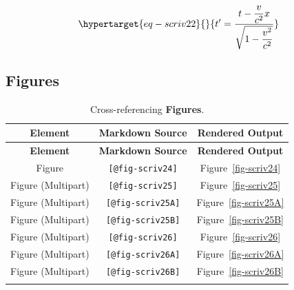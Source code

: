 \documentclass[
  12pt,
  a4paper,
  oneside,
  titlepage,
  toclink=all,
  toc=bibliography]{scrbook}
\theoremstyle{definition}
\theoremstyle{plain}
\theoremstyle{plain}
\theoremstyle{plain}
\theoremstyle{plain}
\theoremstyle{definition}
\theoremstyle{definition}
\theoremstyle{plain}
\theoremstyle{remark}
\begin{document}
\begin{equation}\protect\hypertarget{eq-scriv22}{}{t' = \frac{t - \dfrac{v}{c^{2}}x}{\sqrt{1 - \dfrac{v^{2}}{c^{2}}}}
}\label{eq-scriv22}\end{equation}

\hypertarget{sec-scriv23}{%
\subsection{Figures}\label{sec-scriv23}}

\protect\hypertarget{scriv23}{}{}

\hypertarget{tbl-scriv23}{}
\begin{longtable}[]{@{}ccc@{}}
\toprule\noalign{}
\textbf{Element} & \textbf{Markdown Source} & \textbf{Rendered
Output} \\
\midrule\noalign{}
\endfirsthead
\toprule\noalign{}
\textbf{Element} & \textbf{Markdown Source} & \textbf{Rendered
Output} \\
\midrule\noalign{}
\endhead
\bottomrule\noalign{}
\endlastfoot
Figure & \texttt{{[}@fig-scriv24{]}} &
\protect\hypertarget{cite_58}{}{\label{cite_58}Figure~\ref{fig-scriv24}} \\
Figure (Multipart) & \texttt{{[}@fig-scriv25{]}} &
\protect\hypertarget{cite_59}{}{\label{cite_59}Figure~\ref{fig-scriv25}} \\
Figure (Multipart) & \texttt{{[}@fig-scriv25A{]}} &
\protect\hypertarget{cite_60}{}{\label{cite_60}Figure~\ref{fig-scriv25A}} \\
Figure (Multipart) & \texttt{{[}@fig-scriv25B{]}} &
\protect\hypertarget{cite_61}{}{\label{cite_61}Figure~\ref{fig-scriv25B}} \\
Figure (Multipart) & \texttt{{[}@fig-scriv26{]}} &
\protect\hypertarget{cite_62}{}{\label{cite_62}Figure~\ref{fig-scriv26}} \\
Figure (Multipart) & \texttt{{[}@fig-scriv26A{]}} &
\protect\hypertarget{cite_63}{}{\label{cite_63}Figure~\ref{fig-scriv26A}} \\
Figure (Multipart) & \texttt{{[}@fig-scriv26B{]}} &
\protect\hypertarget{cite_64}{}{\label{cite_64}Figure~\ref{fig-scriv26B}} \\
\caption{\label{tbl-scriv23}Cross-referencing
\textbf{Figures}.}\tabularnewline
\end{longtable}
\end{document}
